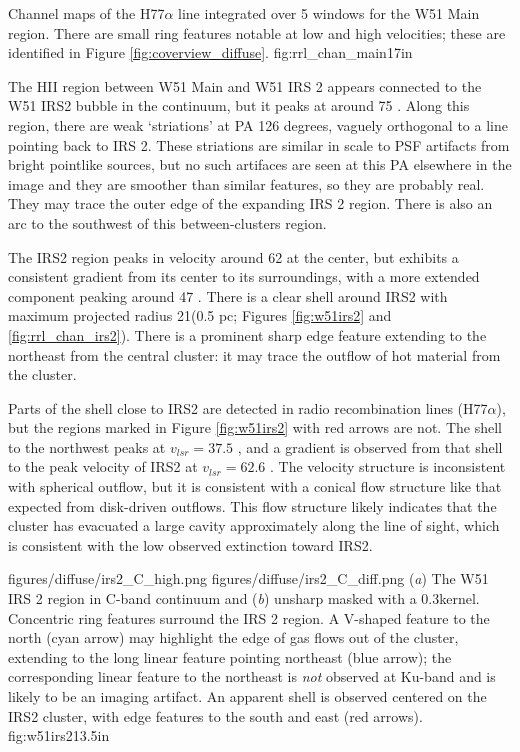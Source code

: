 {Channel maps of the H77$\alpha$ line integrated over 5 \kms windows
for the W51 Main region.  There are small ring features notable at low and high
velocities; these are identified in Figure \ref{fig:coverview_diffuse}.}
{fig:rrl_chan_main}{1}{7in}

The HII region between W51 Main and W51 IRS 2 appears connected to the W51 IRS2
bubble in the continuum, but it peaks at around 75 \kms.  Along this region,
there are weak `striations' at PA 126 degrees, vaguely orthogonal to a line
pointing back to IRS 2.  These striations are similar in scale to PSF artifacts
from bright pointlike sources, but no such artifaces are seen at this PA
elsewhere in the image and they are smoother than similar features, so they are
probably real.  They may trace the outer edge of the expanding IRS 2 region.
There is also an arc to the southwest of this between-clusters region.

The IRS2 region peaks in velocity around 62 \kms at the center, but exhibits a
consistent gradient from its center to its surroundings, with a more extended
component peaking around 47 \kms.  There is a clear shell around IRS2
with maximum projected radius 21\arcsec (0.5 pc; Figures \ref{fig:w51irs2} and
\ref{fig:rrl_chan_irs2}).  There is a prominent sharp edge feature extending to
the northeast from the central cluster: it may trace the outflow of hot
material from the cluster.

Parts of the shell close to IRS2 are detected in radio recombination lines
(H77$\alpha$), but the regions marked in Figure \ref{fig:w51irs2} with red
arrows are not.  The shell to the northwest peaks at $v_{lsr}=37.5$ \kms, and a
gradient is observed from that shell to the peak velocity of IRS2 at $v_{lsr} =
62.6$ \kms.  The velocity structure is inconsistent with spherical outflow, but
it is consistent with a conical flow structure like that expected from
disk-driven outflows.  This flow structure likely indicates that the cluster
has evacuated a large cavity approximately along the line of sight, which is
consistent with the low observed extinction toward IRS2.  

\FigureTwo
{figures/diffuse/irs2_C_high.png}
{figures/diffuse/irs2_C_diff.png}
{(\textit{a}) The W51 IRS 2 region in C-band continuum and (\textit{b}) unsharp
masked with a 0.3\arcsec kernel.  Concentric ring features surround the IRS 2
region.  A V-shaped feature to the north (cyan arrow) may highlight the edge of
gas flows out of the cluster, extending to the long linear feature pointing
northeast (blue arrow); the corresponding linear feature to the northeast is
\emph{not} observed at Ku-band and is likely to be an imaging artifact.  An
apparent shell is observed centered on the IRS2 cluster, with edge
features to the south and east (red arrows).
}
{fig:w51irs2}{1}{3.5in}

